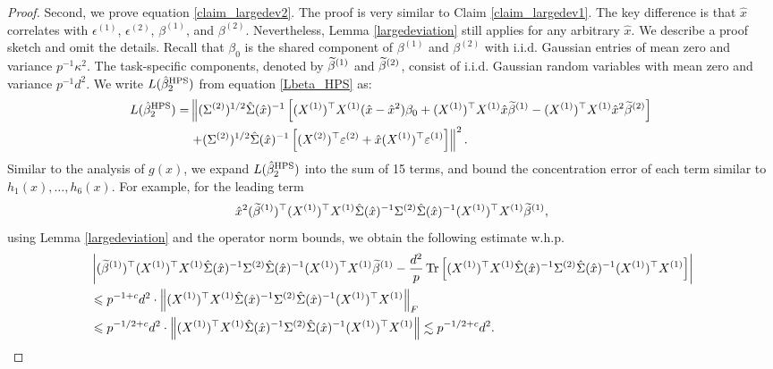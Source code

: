 \begin{proof}
Second, we prove equation \eqref{claim_largedev2}.
The proof is very similar to Claim \ref{claim_largedev1}.
The key difference is that $\hat x$ correlates with $\epsilon^{(1)}$, $\epsilon^{(2)}$, $\beta^{(1)}$, and $\beta^{(2)}$.
Nevertheless, Lemma \ref{largedeviation} still applies for any arbitrary $\hat x$.
We describe a proof sketch and omit the details.
Recall that $\beta_0$ is the shared component of $\beta^{(1)}$ and $\beta^{(2)}$ with i.i.d. Gaussian entries of mean zero and variance $p^{-1}\kappa^2$.
The task-specific components, denoted by $\widetilde\beta^{(1)}$ and $\widetilde\beta^{(2)}$, consist of i.i.d. Gaussian random variables with mean zero and variance $p^{-1} d^2$.
We write $L(\hat{\beta}_2^{\textup{HPS}}) $ from equation \eqref{Lbeta_HPS} as:
\begin{align}
L(\hat{\beta}_2^{\textup{HPS}})  =&  \left\| (\Sigma^{(2)})^{1/2}\hat \Sigma(\hat x)^{-1} \left[(X^{(1)})^\top X^{(1)} (\hat x -\hat x^2)\beta_0+(X^{(1)})^\top X^{(1)} \hat x\widetilde \beta^{(1)} - (X^{(1)})^\top X^{(1)}  \hat x^2\widetilde \beta^{(2)} \right] \right. \nonumber\\
&\left. + (\Sigma^{(2)})^{1/2}\hat \Sigma(\hat x)^{-1}\left[ (X^{(2)})^\top \varepsilon^{(2)} + \hat x   (X^{(1)})^\top \varepsilon^{(1)} \right]\right\|^2. \label{expand_15}
\end{align}
Similar to the analysis of $g(x)$, we expand $L(\hat{\beta}_2^{\textup{HPS}})$ into the sum of 15 terms, and bound the concentration error of each term similar to $h_1(x), \dots, h_6(x)$.
For example, for the leading term 
\[\hat x^2 (\widetilde \beta^{(1)})^\top (X^{(1)})^\top X^{(1)} \hat \Sigma(\hat x)^{-1}  \Sigma^{(2)} \hat \Sigma(\hat x)^{-1}  (X^{(1)})^\top X^{(1)}\widetilde\beta^{(1)},\] 
using Lemma \ref{largedeviation} and the operator norm bounds, we obtain the following estimate w.h.p.
\begin{align*}
&  \left| (\widetilde \beta^{(1)})^\top (X^{(1)})^\top X^{(1)} \hat \Sigma(\hat x)^{-1}  \Sigma^{(2)} \hat \Sigma(\hat x)^{-1}  (X^{(1)})^\top X^{(1)}\widetilde\beta^{(1)} - \frac{d^2}{p}\operatorname{Tr}\left[(X^{(1)})^\top X^{(1)} \hat \Sigma(\hat x)^{-1}  \Sigma^{(2)} \hat \Sigma(\hat x)^{-1}  (X^{(1)})^\top X^{(1)}\right]\right| \\
&\leqslant p^{-1+c}d^2 \cdot \left\| (X^{(1)})^\top X^{(1)} \hat \Sigma(\hat x)^{-1}  \Sigma^{(2)} \hat \Sigma(\hat x)^{-1}  (X^{(1)})^\top X^{(1)} \right\|_F \\
&\leqslant p^{-1/2+c}d^2 \cdot  \left\| (X^{(1)})^\top X^{(1)} \hat \Sigma(\hat x)^{-1}  \Sigma^{(2)} \hat \Sigma(\hat x)^{-1}  (X^{(1)})^\top X^{(1)} \right\|  \lesssim p^{-1/2+c}d^2.
\end{align*} 

\end{proof}
